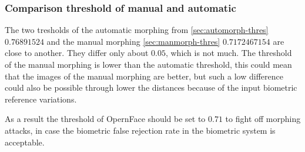 \subsubsection{Comparison threshold of manual and automatic}\label{sec:comp-thres}
The two tresholds of the automatic morphing from \ref{sec:automorph-thres} $0.76891524$ and the manual morphing \ref{sec:manmorph-thres} $0.7172467154$ are close to another. They differ only about $0.05$, which is not much. The threshold of the manual morphing is lower than the automatic threshold, this could mean that the images of the manual morphing are better, but such a low difference could also be possible through lower the distances because of the input biometric reference variations.

As a result the threshold of OpernFace should be set to $0.71$ to fight off morphing attacks, in case the biometric false rejection rate in the biometric system is acceptable.